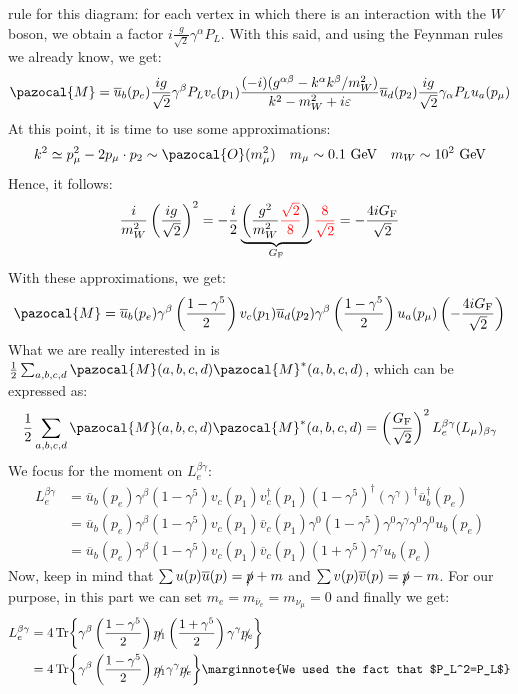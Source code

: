 \documentclass[../main.tex]{subfiles}
\begin{document}
rule for this diagram: for each vertex in which there is an interaction with the $W$ boson, we obtain a factor $i\frac{g}{\sqrt{2}}\gamma^\alpha P_L$. With this said, and using the Feynman rules we already know, we get:
\[
\pazocal{M}=\overline{u}_b(p_e)\frac{ig}{\sqrt{2}}\gamma^\beta P_Lv_c(p_1)\frac{(-i)(g^{\alpha\beta}-k^\alpha k^\beta/m_W^2)}{k^2-m^2_W+i\varepsilon}\overline{u}_d(p_2)\frac{ig}{\sqrt{2}}\gamma_\alpha P_Lu_a(p_\mu)
\]
At this point, it is time to use some approximations:
\[
k^2\simeq p^2_\mu-2p_\mu\cdot p_2\sim\pazocal{O}(m_\mu^2) \quad m_\mu\sim0.1\text{ GeV} \quad m_W\sim10^2\text{ GeV}
\]
Hence, it follows:
\[
\frac{i}{m^2_W}\left(\frac{ig}{\sqrt{2}}\right)^2=-\frac{i}{2}\underbrace{\left(\frac{g^2}{m_W^2}{\color{red}\frac{\sqrt{2}}{8}}\right)}_{G_{\text{F}}}{\color{red}\frac{8}{\sqrt{2}}}=-\frac{4iG_{\text{F}}}{\sqrt{2}}
\]
With these approximations, we get:
\[
\pazocal{M}=\overline{u}_b(p_e)\gamma^\beta\left(\frac{1-\gamma^5}{2}\right)v_c(p_1)\overline{u}_d(p_2)\gamma^\beta\left(\frac{1-\gamma^5}{2}\right)u_a(p_\mu)\left(-\frac{4iG_{\text{F}}}{\sqrt{2}}\right)
\]
What we are really interested in is $\frac{1}{2}\sum_{a,b,c,d}\pazocal{M}(a,b,c,d)\pazocal{M}^*(a,b,c,d)$, which can be expressed as:
\[
\frac{1}{2}\sum_{a,b,c,d}\pazocal{M}(a,b,c,d)\pazocal{M}^*(a,b,c,d)=\left(\frac{G_{\text{F}}}{\sqrt{2}}\right)^2L_e^{\beta\gamma}(L_\mu)_{\beta\gamma}
\]
We focus for the moment on $L_e^{\beta\gamma}$:
\begin{align*}
L_e^{\beta\gamma}&=\overline{u}_b(p_e)\gamma^\beta(1-\gamma^5)v_c(p_1)v_c^\dagger(p_1)(1-\gamma^5)^\dagger(\gamma^\gamma)^\dagger\overline{u}_b^\dagger(p_e)\\
&=\overline{u}_b(p_e)\gamma^\beta(1-\gamma^5)v_c(p_1)\overline{v}_c(p_1)\gamma^0(1-\gamma^5)\gamma^0\gamma^\gamma\gamma^0\gamma^0u_b(p_e)\\
&=\overline{u}_b(p_e)\gamma^\beta(1-\gamma^5)v_c(p_1)\overline{v}_c(p_1)(1+\gamma^5)\gamma^\gamma u_b(p_e)
\end{align*}
Now, keep in mind that $\sum u(p)\overline{u}(p)=\slashed{p}+m$ and $\sum v(p)\overline{v}(p)=\slashed{p}-m$. For our purpose, in this part we can set $m_e=m_{\overline{\nu}_e}=m_{\nu_\mu}=0$ and finally we get:
\begin{align*}
L_e^{\beta\gamma}&=4\Tr{\gamma^\beta\left(\frac{1-\gamma^5}{2}\right)\slashed{p_1}\left(\frac{1+\gamma^5}{2}\right)\gamma^\gamma\slashed{p_e}}\\
&=4\Tr{\gamma^\beta\left(\frac{1-\gamma^5}{2}\right)\slashed{p_1}\gamma^\gamma\slashed{p_e}}\marginnote{We used the fact that $P_L^2=P_L$}
\end{align*}
\end{document}
